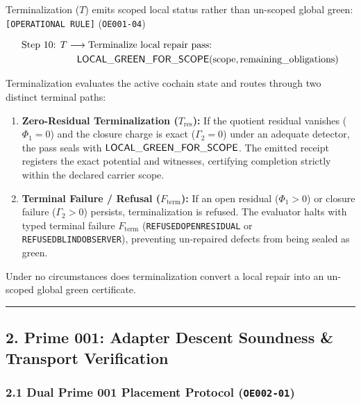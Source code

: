 \documentclass[
  11pt,
]{article}
\providecommand{\tightlist}{%
  \setlength{\itemsep}{0pt}\setlength{\parskip}{0pt}}
\renewcommand{\_}{\origunderscore\allowbreak}
\begin{document}
Terminalization (\(T\)) emits scoped local status rather than un-scoped
global green: \texttt{{[}OPERATIONAL\ RULE{]}} (\texttt{OE001-04})

\[\begin{aligned}
\text{Step 10: } T &\longrightarrow \text{Terminalize local repair pass:} \\
&\quad \mathsf{LOCAL\_GREEN\_FOR\_SCOPE}(\text{scope}, \text{remaining\_obligations})
\end{aligned}\]

Terminalization evaluates the active cochain state and routes through
two distinct terminal paths:

\begin{enumerate}
\def\labelenumi{\arabic{enumi}.}
\tightlist
\item
  \textbf{Zero-Residual Terminalization (\(T_{\text{res}}\)):} If the
  quotient residual vanishes (\(\Phi_1 = 0\)) and the closure charge is
  exact (\(\Gamma_2 = 0\)) under an adequate detector, the pass seals
  with \(\mathsf{LOCAL\_GREEN\_FOR\_SCOPE}\). The emitted receipt
  registers the exact potential and witnesses, certifying completion
  strictly within the declared carrier scope.
\item
  \textbf{Terminal Failure / Refusal (\(F_{\text{term}}\)):} If an open
  residual (\(\Phi_1 > 0\)) or closure failure (\(\Gamma_2 > 0\))
  persists, terminalization is refused. The evaluator halts with typed
  terminal failure \(F_{\text{term}}\) (\texttt{REFUSED\_OPEN\_RESIDUAL}
  or \texttt{REFUSED\_BLIND\_OBSERVER}), preventing un-repaired defects
  from being sealed as green.
\end{enumerate}

Under no circumstances does terminalization convert a local repair into
an un-scoped global green certificate.

\begin{center}\rule{0.5\linewidth}{0.5pt}\end{center}

\subsection{2. Prime 001: Adapter Descent Soundness \& Transport
Verification}\label{prime-001-adapter-descent-soundness-transport-verification}

\subsubsection{\texorpdfstring{2.1 Dual Prime 001 Placement Protocol
(\texttt{OE002-01})}{2.1 Dual Prime 001 Placement Protocol (OE002-01)}}\label{dual-prime-001-placement-protocol-oe002-01}
\end{document}

